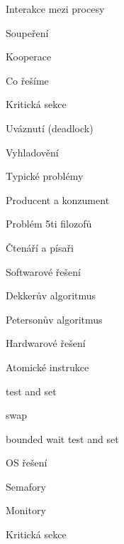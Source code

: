 \begin{compactitem}
    \item Interakce mezi procesy \begin{compactitem}
        \item Soupeření
        \item Kooperace
    \end{compactitem}

    \item Co řešíme \begin{compactitem}
        \item Kritická sekce
        \item Uváznutí (deadlock)
        \item Vyhladovění
    \end{compactitem}

    \item Typické problémy \begin{compactitem}
        \item Producent a konzument
        \item Problém 5ti filozofů
        \item Čtenáří a písaři
    \end{compactitem}

    \item Softwarové řešení \begin{compactitem}
        \item Dekkerův algoritmus
        \item Petersonův algoritmus
    \end{compactitem}

    \item Hardwarové řešení \begin{compactitem}
        \item Atomické instrukce \begin{compactitem}
            \item test and set
            \item swap
            \item bounded wait test and set
        \end{compactitem}
    \end{compactitem}

    \item OS řešení \begin{compactitem}
        \item Semafory
        \item Monitory
        \item Kritická sekce
    \end{compactitem}
\end{compactitem}


